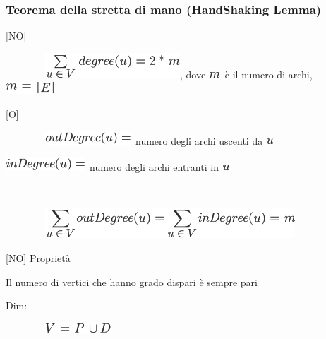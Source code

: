 \documentclass{article}
\begin{document}
\hypertarget{h.d1yeo9bkhutt}{\subsubsection{\texorpdfstring{{Teorema
della stretta di mano (HandShaking
Lemma)}}{Teorema della stretta di mano (HandShaking Lemma)}}\label{h.d1yeo9bkhutt}}

{{[}NO{]}}

{~~~~~~~~}\includegraphics{images/image361.png}{, dove
}\includegraphics{images/image235.png}{~è il numero di archi,
}\includegraphics{images/image362.png}

{{[}O{]}}

{~~~~~~~~}\includegraphics{images/image363.png}{~numero degli archi
uscenti da }\includegraphics{images/image103.png}

\includegraphics{images/image364.png}{~numero degli archi entranti in
}\includegraphics{images/image103.png}

{~~~~~~~~}

{~~~~~~~~}\includegraphics{images/image365.png}

{}

{{[}NO{]} Proprietà}

{Il numero di vertici che hanno grado dispari è sempre pari}

{Dim: }

{~~~~~~~~}\includegraphics{images/image366.png}
\end{document}
